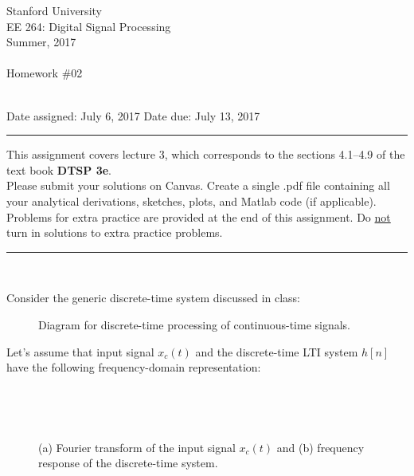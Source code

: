 \documentclass[12pt]{report}
\begin{document}
\thispagestyle{empty}
\begin{centering}
	{\large Stanford University}\\
	{\large EE 264: Digital Signal Processing}\\
	{\large Summer, 2017} \\
	\mbox{}\\
	{\large Homework \#02}\\
	\mbox{}\\
\end{centering}
\noindent Date assigned:  July 6, 2017 \hfill
Date due: July 13, 2017\\
\noindent \rule{6.5 in}{0.5pt}
  This assignment covers lecture 3, which corresponds to the sections 4.1--4.9 of the text book {\bf DTSP 3e}. \\
  Please submit your solutions on Canvas. Create a single .pdf file containing all your analytical derivations, sketches, plots, and Matlab code (if applicable). \\
  Problems for extra practice are provided at the end of this assignment. Do \underline{not} turn in solutions to extra practice problems.

\noindent
\rule{6.5 in}{0.5pt}
\mbox{}\\


Consider the generic discrete-time system discussed in class:

\begin{figure}[!h]
	\centering
	\resizebox{0.9\textwidth}{!}{}
	\caption{Diagram for discrete-time processing of continuous-time signals.}
\end{figure}

Let's assume that input signal $x_c(t)$ and the discrete-time LTI system $h[n]$ have the following frequency-domain representation:

\begin{figure}[h]
	\begin{subfigure}[t]{0.5\textwidth}
		\centering
		\resizebox{\textwidth}{!}{}
		\caption{~}
	\end{subfigure}%
	\begin{subfigure}[t]{0.5\textwidth}
		\centering
		\resizebox{\textwidth}{!}{}
		\caption{~}
	\end{subfigure}
	\caption{(a) Fourier transform of the input signal $x_c(t)$ and (b) frequency response of the discrete-time system.}
\end{figure}
\end{document}
